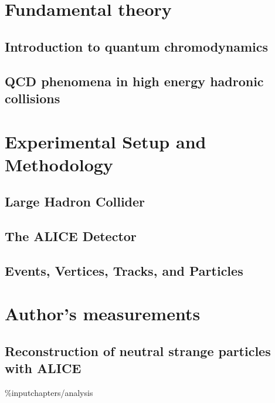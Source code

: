 \documentclass[11pt]{book}
\begin{document}
\mainmatter
\setcounter{table}{0} 
\setcounter{page}{1}

\chap{\myTitle}
\newpage

\part{Fundamental theory}
\chapter{Introduction to quantum chromodynamics}

\chapter{QCD phenomena in high energy hadronic collisions}


\part{Experimental Setup and Methodology}
\chapter{Large Hadron Collider}

\chapter{The ALICE Detector}
%
\chapter{Events, Vertices, Tracks, and Particles}


\part{Author's measurements}
\chapter{Reconstruction of neutral strange particles with ALICE}
\%input{chapters/analysis}
\end{document}
